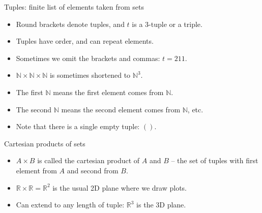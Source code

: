 \documentclass{beamer}
\begin{document}
  \begin{frame}{Tuples: finite list of elements taken from sets}
    \begin{itemize}
      \setlength\itemsep{2mm}
      \item Round brackets denote tuples, and $t$ is a $3$-tuple or a triple.
      \item Tuples have order, and can repeat elements.
      \item Sometimes we omit the brackets and commas: $t = 211$.
      \item $\mathbb{N} \times \mathbb{N} \times \mathbb{N}$ is sometimes shortened to $\mathbb{N}^3$.
      \item The first $\mathbb{N}$ means the first element comes from $\mathbb{N}$.
      \item The second $\mathbb{N}$ means the second element comes from $\mathbb{N}$, etc.
      \item Note that there is a single empty tuple: $()$.
    \end{itemize}
  \end{frame}
  
  
  \begin{frame}[fragile]{Cartesian products of sets}
    
    \begin{itemize}
      \item $A \times B$ is called the cartesian product of $A$ and $B$ -- the set of tuples with first element from $A$ and second from $B$.
      \item $\mathbb{R} \times \mathbb{R} = \mathbb{R}^2$ is the usual 2D plane where we draw plots.
      \item Can extend to any length of tuple: $\mathbb{R}^3$ is the 3D plane.
    \end{itemize}
  
    \begin{center}
      \hspace{5mm}
    \end{center}
  \end{frame}
  
\end{document}
